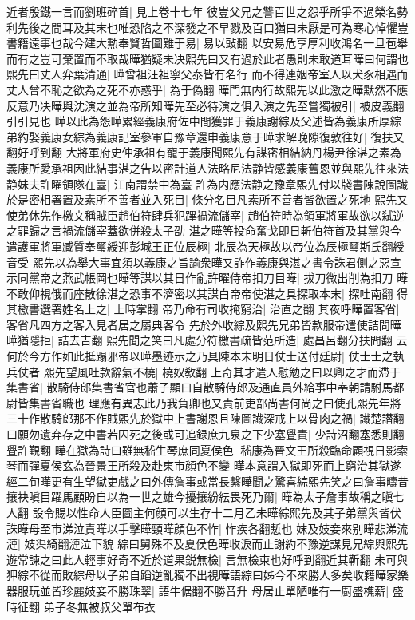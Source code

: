 近者殷鐵一言而劉班碎首|{
	見上卷十七年}
彼豈父兄之讐百世之怨乎所爭不過榮名勢利先後之間耳及其末也唯恐陷之不深發之不早戮及百口猶曰未厭是可為寒心悼懼豈書籍遠事也哉今建大勲奉賢哲圖難于易|{
	易以䜴翻}
以安易危享厚利收鴻名一旦苞舉而有之豈可棄置而不取哉曄猶疑未决熙先曰又有過於此者愚則未敢道耳曄曰何謂也熙先曰丈人弈葉清通|{
	曄曾祖汪祖寧父泰皆冇名行}
而不得連姻帝室人以犬豕相遇而丈人曾不恥之欲為之死不亦惑乎|{
	為于偽翻}
曄門無内行故熙先以此激之曄默然不應反意乃决曄與沈演之並為帝所知曄先至必待演之俱入演之先至嘗獨被引|{
	被皮義翻引引見也}
曄以此為怨曄累經義康府佐中間獲罪于義康謝綜及父述皆為義康所厚綜弟約娶義康女綜為義康記室參軍自豫章還申義康意于曄求解晚隙復敦往好|{
	復扶又翻好呼到翻}
大將軍府史仲承祖有寵于義康聞熙先有謀密相結納丹楊尹徐湛之素為義康所愛承祖因此結事湛之告以密計道人法略尼法静皆感義康舊恩並與熙先往來法静妹夫許曜領隊在臺|{
	江南謂禁中為臺}
許為内應法静之豫章熙先付以牋書陳說圖䜟於是密相署置及素所不善者並入死目|{
	條分名目凡素所不善者皆欲置之死地}
熙先又使弟休先作檄文稱賊臣趙伯符肆兵犯蹕禍流儲宰|{
	趙伯符時為領軍將軍故欲以弑逆之罪歸之言禍流儲宰蓋欲併殺太子劭}
湛之曄等投命奮戈即日斬伯符首及其黨與今遣護軍將軍臧質奉璽綬迎彭城王正位辰極|{
	北辰為天極故以帝位為辰極璽斯氏翻綬音受}
熙先以為舉大事宜須以義康之旨諭衆曄又詐作義康與湛之書令誅君側之惡宣示同黨帝之燕武帳岡也曄等謀以其日作亂許曜侍帝扣刀目曄|{
	拔刀微出削為扣刀}
曄不敢仰視俄而座散徐湛之恐事不濟密以其謀白帝帝使湛之具探取本末|{
	探吐南翻}
得其檄書選署姓名上之|{
	上時掌翻}
帝乃命有司收掩窮治|{
	治直之翻}
其夜呼曄置客省|{
	客省凡四方之客入見者居之屬典客令}
先於外收綜及熙先兄弟皆款服帝遣使詰問曄曄猶隱拒|{
	詰去吉翻}
熙先聞之笑曰凡處分符檄書疏皆范所造|{
	處昌呂翻分扶問翻}
云何於今方作如此抵蹋邪帝以曄墨迹示之乃具陳本末明日仗士送付廷尉|{
	仗士士之執兵仗者}
熙先望風吐款辭氣不橈|{
	橈奴敎翻}
上奇其才遣人慰勉之曰以卿之才而滯于集書省|{
	散騎侍郎集書省官也蕭子顯曰自散騎侍郎及通直員外給事中奉朝請駙馬都尉皆集書省職也}
理應有異志此乃我負卿也又責前吏部尚書何尚之曰使孔熙先年將三十作散騎郎那不作賊熙先於獄中上書謝恩且陳圖䜟深戒上以骨肉之禍|{
	䜟楚譛翻}
曰願勿遺弃存之中書若囚死之後或可追録庶九泉之下少塞舋責|{
	少詩沼翻塞悉則翻舋許覲翻}
曄在獄為詩曰雖無嵇生琴庶同夏侯色|{
	嵇康為晉文王所殺臨命顧視日影索琴而彈夏侯玄為晉景王所殺及赴東市顔色不變}
曄本意謂入獄即死而上窮治其獄遂經二旬曄更有生望獄吏戲之曰外傳詹事或當長繫曄聞之驚喜綜熙先笑之曰詹事疇昔攘袂瞋目躍馬顧盼自以為一世之雄今擾攘紛紜畏死乃爾|{
	曄為太子詹事故稱之瞋七人翻}
設令賜以性命人臣圖主何顔可以生存十二月乙未曄綜熙先及其子弟黨與皆伏誅曄母至市涕泣責曄以手擊曄頸曄顔色不怍|{
	怍疾各翻慙也}
妺及妓妾來别曄悲涕流漣|{
	妓渠綺翻漣泣下貌}
綜曰舅殊不及夏侯色曄收淚而止謝約不豫逆謀見兄綜與熙先遊常諫之曰此人輕事好奇不近於道果鋭無檢|{
	言無檢束也好呼到翻近其靳翻}
未可與狎綜不從而敗綜母以子弟自蹈逆亂獨不出視曄語綜曰姊今不來勝人多矣收籍曄家樂器服玩並皆珍麗妓妾不勝珠翠|{
	語牛倨翻不勝音升}
母居止單陋唯有一㕑盛樵薪|{
	盛時征翻}
弟子冬無被叔父單布衣

